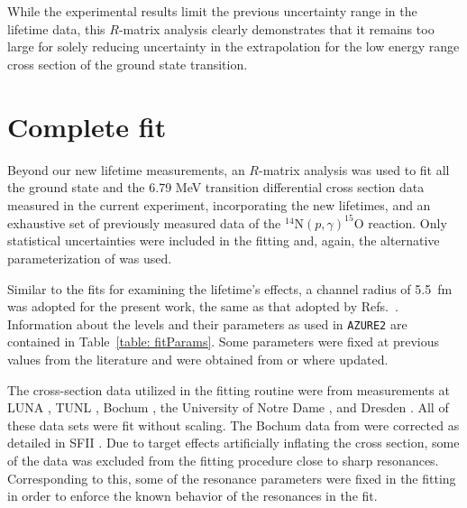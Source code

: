 While the experimental results limit the previous uncertainty range in the lifetime data, this $R$-matrix analysis clearly demonstrates that it remains too large for solely reducing uncertainty in the extrapolation for the low energy range cross section of the ground state transition.




\section{Complete fit}
\label{sec: complete fit}


Beyond our new lifetime measurements, an $R$-matrix analysis was used to fit all the ground state and the 6.79 MeV transition differential cross section data measured in the current experiment, incorporating the new lifetimes, and an exhaustive set of previously measured data of the $^{14}$N$(p,\gamma)^{15}$O reaction. Only statistical uncertainties were included in the fitting and, again, the alternative parameterization of \citet{PhysRevC.66.044611} was used.

Similar to the fits for examining the lifetime's effects, a channel radius of 5.5~fm was adopted for the present work, the same as that adopted by Refs.~\cite{Adelberger2011, Li2016, Wagner2018, Frentz2021}. Information about the levels and their parameters as used in \texttt{AZURE2} are contained in Table~\ref{table: fitParams}. Some parameters were fixed at previous values from the literature and were obtained from \citet{Ajzenberg-Selove1991} or \citet{Daigle2016} where updated.




The cross-section data utilized in the fitting routine were from measurements at LUNA \cite{Formicola2004, Imbriani2005, Marta2008, Marta2011}, TUNL \cite{Runkle2005}, Bochum \cite{Schroder1987}, the University of Notre Dame \cite{Li2016}, and Dresden \cite{Wagner2018}. All of these data sets were fit without scaling. The Bochum data from \citet{Schroder1987} were corrected as detailed in SFII \cite{Adelberger2011}. Due to target effects artificially inflating the cross section, some of the data was excluded from the fitting procedure close to sharp resonances. Corresponding to this, some of the resonance parameters were fixed in the fitting in order to enforce the known behavior of the resonances in the fit. 

